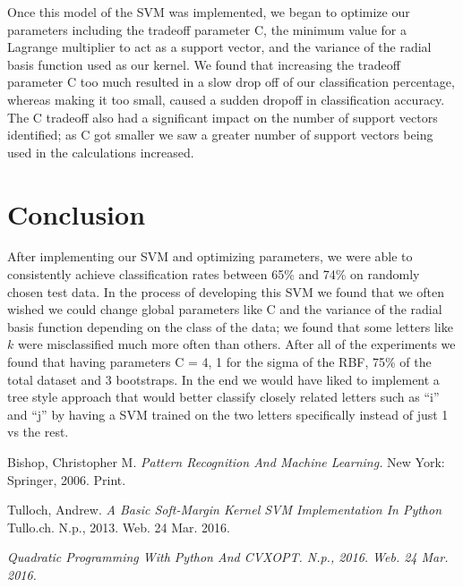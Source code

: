 \documentclass[journal]{IEEEtran}
\begin{document}
Once this model of the SVM was implemented, we began to optimize our parameters including the tradeoff parameter C, the minimum value for a Lagrange multiplier to act as a support vector, and the variance of the radial basis function used as our kernel. We found that increasing the tradeoff parameter C too much resulted in a slow drop off of our classification percentage, whereas making it too small, caused a sudden dropoff in classification accuracy. The C tradeoff also had a significant impact on the number of support vectors identified; as C got smaller we saw a greater number of support vectors being used in the calculations increased.\\

\section{Conclusion}
After implementing our SVM and optimizing parameters, we were able to consistently achieve classification rates between 65\% and 74\% on randomly chosen test data. In the process of developing this SVM we found that we often wished we could change global parameters like C and the variance of the radial basis function depending on the class of the data; we found that some letters like $k$ were misclassified much more often than others. After all of the experiments we found that having parameters C = 4, 1 for the sigma of the RBF, 75\% of the total dataset and 3 bootstraps. In the end we would have liked to implement a tree style approach that would better classify closely related letters such as “i” and “j” by having a SVM trained on the two letters specifically instead of just 1 vs the rest.


\ifCLASSOPTIONcaptionsoff
  \newpage
\fi

\begin{thebibliography}{1}

  Bishop, Christopher M. \emph{Pattern Recognition And Machine Learning.} New York: Springer, 2006. Print.

  Tulloch, Andrew. \emph{A Basic Soft-Margin Kernel SVM Implementation In Python} Tullo.ch. N.p., 2013. Web. 24 Mar. 2016.

  \emph{Quadratic Programming With Python And CVXOPT. N.p., 2016. Web. 24 Mar. 2016.}

\end{thebibliography}
\end{document}
